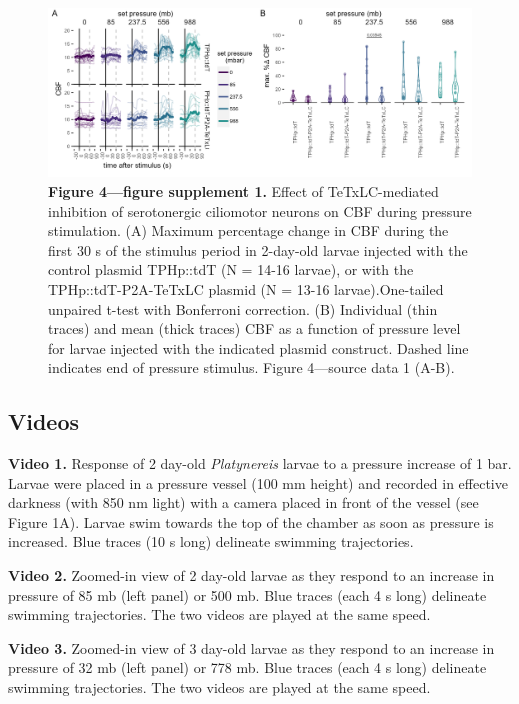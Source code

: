 \documentclass[
  11pt,
]{article}
\begin{document}
\begin{figure}[H]

{\centering \includegraphics[width=1\textwidth,height=\textheight]{Figures/Figure4-FigureSupplement1.png}

}

\caption{\textbf{Figure 4---figure supplement 1. } Effect of
TeTxLC-mediated inhibition of serotonergic ciliomotor neurons on CBF
during pressure stimulation. (A) Maximum percentage change in CBF during
the first 30 s of the stimulus period in 2-day-old larvae injected with
the control plasmid TPHp::tdT (N = 14-16 larvae), or with the
TPHp::tdT-P2A-TeTxLC plasmid (N = 13-16 larvae).One-tailed unpaired
t-test with Bonferroni correction. (B) Individual (thin traces) and mean
(thick traces) CBF as a function of pressure level for larvae injected
with the indicated plasmid construct. Dashed line indicates end of
pressure stimulus. Figure 4---source data 1 (A-B).}

\end{figure}%

\subsection{Videos}\label{videos}

\textbf{Video 1.} Response of 2 day-old \emph{Platynereis} larvae to a
pressure increase of 1 bar. Larvae were placed in a pressure vessel (100
mm height) and recorded in effective darkness (with 850 nm light) with a
camera placed in front of the vessel (see Figure 1A). Larvae swim
towards the top of the chamber as soon as pressure is increased. Blue
traces (10 s long) delineate swimming trajectories.

\textbf{Video 2.} Zoomed-in view of 2 day-old larvae as they respond to
an increase in pressure of 85 mb (left panel) or 500 mb. Blue traces
(each 4 s long) delineate swimming trajectories. The two videos are
played at the same speed.

\textbf{Video 3.} Zoomed-in view of 3 day-old larvae as they respond to
an increase in pressure of 32 mb (left panel) or 778 mb. Blue traces
(each 4 s long) delineate swimming trajectories. The two videos are
played at the same speed.
\end{document}
